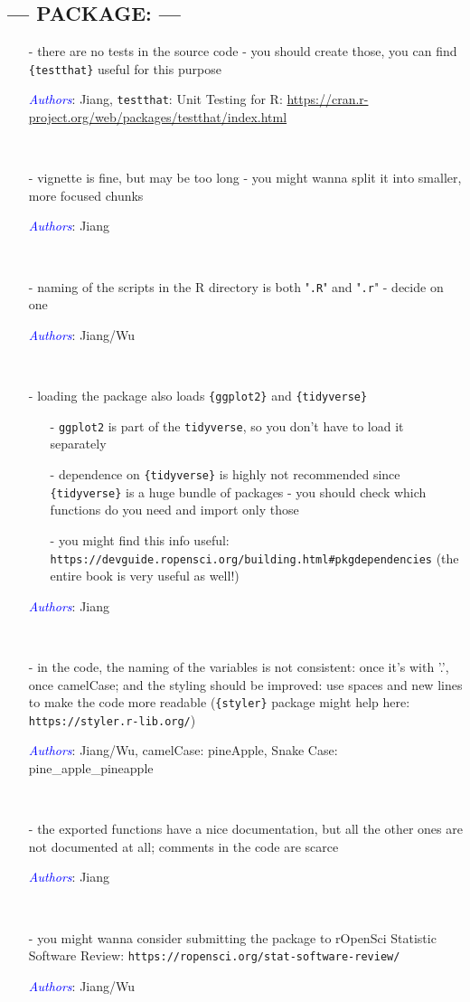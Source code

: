 \documentclass[11pt]{article}
\newcommand{\authors}[1]{

 \parbox{15cm}{\textcolor{blue}{\it Authors}: \color{red}#1}
 \\ \vspace{0.3cm}
}
\begin{document}
\subsection*{--- PACKAGE: ---}
\begin{itemize}
\item[-] there are no tests in the source code - you should create those, you can find {\tt \{testthat\}} useful for this purpose
\authors{Jiang, 
{\tt testthat}: Unit Testing for R: \url{https://cran.r-project.org/web/packages/testthat/index.html}
}


\item[-] vignette is fine, but may be too long - you might wanna split it into smaller, more focused chunks
\authors{Jiang}


\item[-] naming of the scripts in the R directory is both "{\tt .R}" and "{\tt .r}" - decide on one
\authors{Jiang/Wu}


\item[-] loading the package also loads {\tt \{ggplot2\}} and {\tt \{tidyverse\}}
\begin{itemize}
\item[-] {\tt {ggplot2}} is part of the {\tt {tidyverse}}, so you don't have to load it separately
\item[-] dependence on {\tt \{tidyverse\}} is highly not recommended since {\tt \{tidyverse\}} is a huge bundle of packages - you should check which functions do you need and import only those
\item[-] you might find this info useful:
\verb|https://devguide.ropensci.org/building.html#pkgdependencies|
  (the entire book is very useful as well!)
\end{itemize}
\authors{Jiang}



\item[-] in the code, the naming of the variables is not consistent: once it's with '.', once camelCase; and the styling should be improved: use spaces and new lines to make the code more readable ({\tt \{styler\}} package might help here: \verb|https://styler.r-lib.org/|)
\authors{Jiang/Wu,
camelCase: pineApple, 
Snake Case: pine\_apple\_pineapple
}


\item[-] the exported functions have a nice documentation, but all the other ones are not documented at all; comments in the code are scarce
\authors{Jiang

}


\item[-] you might wanna consider submitting the package to rOpenSci Statistic Software Review: \verb|https://ropensci.org/stat-software-review/|
\authors{Jiang/Wu

}


\end{itemize}
\end{document}
